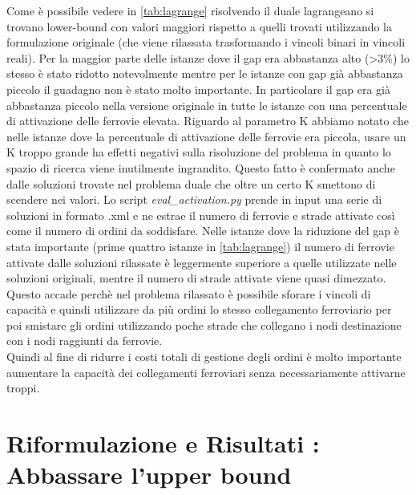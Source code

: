 \documentclass{article}
\begin{document}
Come è possibile vedere in \cref{tab:lagrange} risolvendo il duale lagrangeano si trovano lower-bound con valori maggiori rispetto a quelli trovati utilizzando la formulazione originale (che viene rilassata trasformando i vincoli binari in vincoli reali). Per la maggior parte delle istanze dove il gap era abbastanza alto (>3\%) lo stesso è stato ridotto notevolmente mentre per le istanze con gap già abbastanza piccolo il guadagno non è stato molto importante. In particolare il gap era già abbastanza piccolo nella versione originale in tutte le istanze con una percentuale di attivazione delle ferrovie elevata. Riguardo al parametro K abbiamo notato che nelle istanze dove la percentuale di attivazione delle ferrovie era piccola, usare un K troppo grande ha effetti negativi sulla risoluzione del problema in quanto lo spazio di ricerca viene inutilmente ingrandito. Questo fatto è confermato anche dalle soluzioni trovate nel problema duale che oltre un certo K smettono di scendere nei valori.
Lo script \emph{eval\_activation.py} prende in input una serie di soluzioni in formato .xml e ne estrae il numero di ferrovie e strade attivate così come il numero di ordini da soddisfare. Nelle istanze dove la riduzione del gap è stata importante (prime quattro istanze in \cref{tab:lagrange}) il numero di ferrovie attivate dalle soluzioni rilassate è leggermente superiore a quelle utilizzate nelle soluzioni originali, mentre il numero di strade attivate viene quasi dimezzato. Questo accade perchè nel problema rilassato è possibile sforare i vincoli di capacità e quindi utilizzare da più ordini lo stesso collegamento ferroviario per poi smistare gli ordini utilizzando poche strade che collegano i nodi destinazione con i nodi raggiunti da ferrovie.
\\
Quindi al fine di ridurre i costi totali di gestione degli ordini è molto importante aumentare la capacità dei collegamenti ferroviari senza necessariamente attivarne troppi.

\section{Riformulazione e Risultati : Abbassare l'upper bound}

\end{document}
